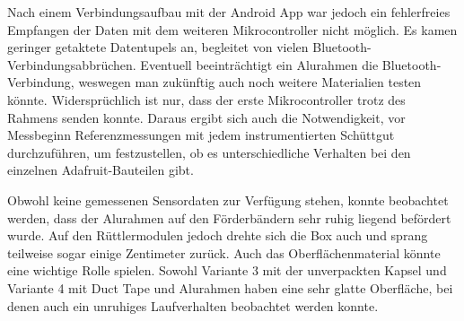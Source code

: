 Nach einem Verbindungsaufbau mit der Android App war jedoch ein fehlerfreies Empfangen der Daten mit dem weiteren Mikrocontroller nicht möglich. Es kamen geringer getaktete Datentupels an, begleitet von vielen Bluetooth-Verbindungsabbrüchen. Eventuell beeinträchtigt ein Alurahmen die Bluetooth-Verbindung, weswegen man zukünftig auch noch weitere Materialien testen könnte. Widersprüchlich ist nur, dass der erste Mikrocontroller trotz des Rahmens senden konnte. Daraus ergibt sich auch die Notwendigkeit, vor Messbeginn Referenzmessungen mit jedem instrumentierten Schüttgut durchzuführen, um festzustellen, ob es unterschiedliche Verhalten bei den einzelnen Adafruit-Bauteilen gibt.

Obwohl keine gemessenen Sensordaten zur Verfügung stehen, konnte beobachtet werden, dass der Alurahmen auf den Förderbändern sehr ruhig liegend befördert wurde. Auf den Rüttlermodulen jedoch drehte sich die Box auch und sprang teilweise sogar einige Zentimeter zurück. Auch das Oberflächenmaterial könnte eine wichtige Rolle spielen. Sowohl Variante 3 mit der unverpackten Kapsel und Variante 4 mit Duct Tape und Alurahmen haben eine sehr glatte Oberfläche, bei denen auch ein unruhiges Laufverhalten beobachtet werden konnte.
